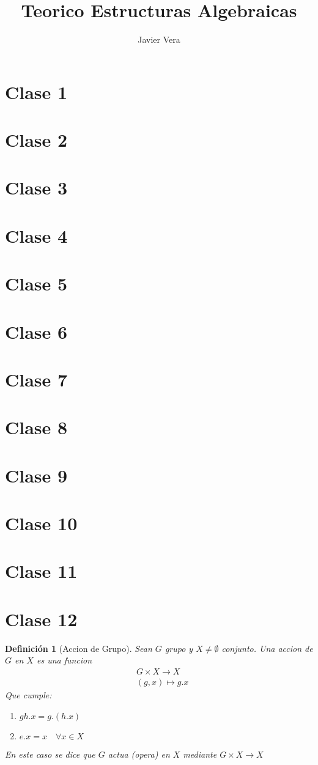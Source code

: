 \documentclass[10pt]{extarticle}
\theoremstyle{break}
\newtheorem{definition}{Definición}[section]
\theoremstyle{definition}
\begin{document}
\title{Teorico Estructuras Algebraicas}
\author{Javier Vera}
\maketitle


\section{Clase 1}
\section{Clase 2}
\section{Clase 3}
\section{Clase 4}
\section{Clase 5}
\section{Clase 6}
\section{Clase 7}
\section{Clase 8}
\section{Clase 9}
\section{Clase 10}
\section{Clase 11}

\section{Clase 12}
\begin{definition}[Accion de Grupo]
	Sean $G$ grupo y $X\neq\emptyset$ conjunto. Una accion de $G$ en $X$ es una funcion
	\begin{align} 
	& G\times X\longrightarrow X \nonumber\\
	& (g,x)\longmapsto g.x \nonumber
	\end{align}
	Que cumple:

	\begin{enumerate}
		\item $gh.x=g.(h.x)$
		\item $e.x=x\quad\forall x\in X$
	\end{enumerate}
En este caso se dice que $G$ actua (opera) en $X$ mediante $G\times X\longrightarrow X$
\end{definition}
\end{document}

